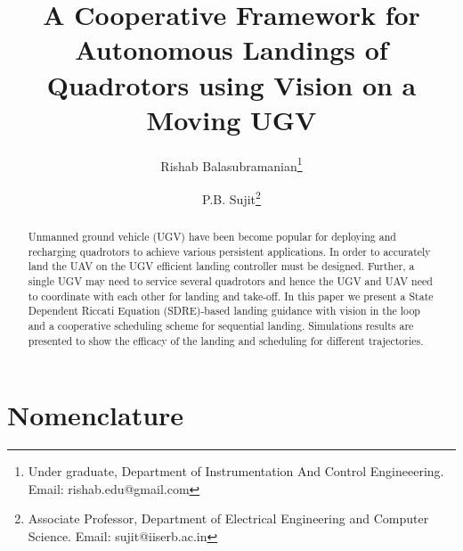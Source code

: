\documentclass[conf]{new-aiaa}
\title{A Cooperative Framework for Autonomous  Landings of Quadrotors using Vision on a Moving UGV}
\author{Rishab Balasubramanian\footnote{Under graduate, Department of Instrumentation And Control Engineeering. Email: rishab.edu@gmail.com }}
\affil{NIT Trichy, Tiruchirappalli -- 620015, India. }
\author{P.B. Sujit\footnote{Associate Professor, Department of Electrical Engineering and Computer Science. Email: sujit@iiserb.ac.in}}
\affil{IISER Bhopal, Bhopal -- 462066, India. }
\begin{document}
\maketitle

\begin{abstract}
Unmanned ground vehicle (UGV) have been become popular for deploying and recharging quadrotors to achieve various persistent applications. In order to accurately land the UAV on the UGV efficient landing controller must be designed.   Further, a single UGV may need to service several quadrotors and hence the UGV and UAV need to coordinate with each other for landing and take-off. In this paper we present a State Dependent Riccati Equation (SDRE)-based landing guidance with vision in the loop and a cooperative scheduling scheme for sequential landing. Simulations results are presented to show the efficacy of the landing and scheduling for different trajectories.  


\end{abstract}

\section{Nomenclature}
\end{document}
